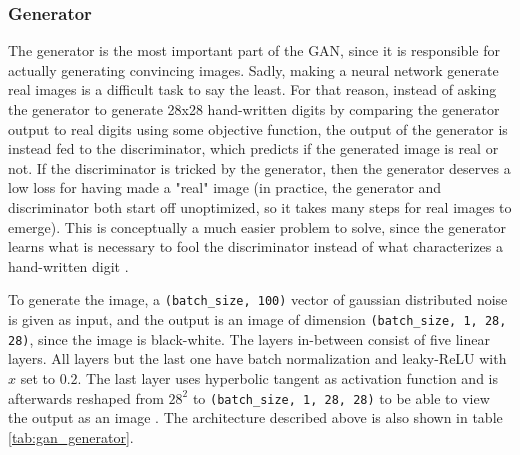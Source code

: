 \documentclass[12pt, fleqn, titlepage]{article}
\begin{document}
\subsubsection{Generator}
The generator is the most important part of the GAN, since it is responsible for actually generating convincing images. Sadly, making a neural network generate real images is a difficult task to say the least. For that reason, instead of asking the generator to generate 28x28 hand-written digits by comparing the generator output to real digits using some objective function, the output of the generator is instead fed to the discriminator, which predicts if the generated image is real or not. If the discriminator is tricked by the generator, then the generator deserves a low loss for having made a "real" image (in practice, the generator and discriminator both start off unoptimized, so it takes many steps for real images to emerge). This is conceptually a much easier problem to solve, since the generator learns what is necessary to fool the discriminator instead of what characterizes a hand-written digit \cite{developers.google_generator}.

To generate the image, a \texttt{(batch\_size, 100)} vector of gaussian distributed noise is given as input, and the output is an image of dimension \texttt{(batch\_size, 1, 28, 28)}, since the image is black-white. The layers in-between consist of five linear layers. All layers but the last one have batch normalization and leaky-ReLU with $x$ set to $0.2$. The last layer uses hyperbolic tangent as activation function and is afterwards reshaped from $28^2$ to \texttt{(batch\_size, 1, 28, 28)} to be able to view the output as an image \cite{pathmind_gen_disc_architecture}. The architecture described above is also shown in table \ref{tab:gan_generator}.
\end{document}
